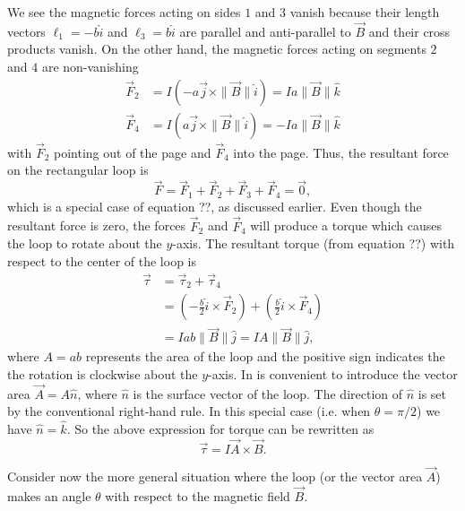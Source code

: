 We see the magnetic forces acting on sides $1$ and $3$ vanish because their length vectors $\ell_1 = -b \hat{i}$ and $\ell_3 = b \hat{i}$ are parallel and anti-parallel to $\vec{B}$ and their cross products vanish. On the other hand, the magnetic forces acting on segments $2$ and $4$ are non-vanishing
\begin{align}
    \vec{F}_2 &= I(-a\vec{j} \times \| \vec{B} \|\hat{i}) = Ia\|\vec{B}\| \hat{k} \\
    \vec{F}_4 &= I(a\vec{j} \times \| \vec{B} \|\hat{i}) = - Ia\|\vec{B}\| \hat{k} 
\end{align}
with $\vec{F}_2$ pointing out of the page and $\vec{F}_4$ into the page. Thus, the resultant force on the rectangular loop is
\begin{equation}
    \vec{F} = \vec{F}_1 + \vec{F}_2 + \vec{F}_3 + \vec{F}_4 = \vec{0},
\end{equation}
which is a special case of equation ??, as discussed earlier. Even though the resultant force is zero, the forces $\vec{F}_2$ and $\vec{F}_4$ will produce a torque which causes the loop to rotate about the $y$-axis. 
The resultant torque (from equation ??) with respect to the center of the loop is
\begin{align}
    \vec{\tau} &= \vec{\tau}_2 + \vec{\tau}_4 \\
    &= \left(-\frac{b}{2}\hat{i} \times \vec{F}_2\right) + \left(\frac{b}{2}\hat{i} \times \vec{F}_4\right) \\
    &= Iab\|\vec{B}\|\hat{j} = IA\|\vec{B}\|\hat{j},
\end{align}
where $A=ab$ represents the area of the loop and the positive sign indicates the the rotation is clockwise about the $y$-axis. In is convenient to introduce the vector area $\vec{A} = A\hat{n}$, where $\hat{n}$ is the surface vector of the loop. The direction of $\hat{n}$ is set by the conventional right-hand rule. In this special case (i.e. when $\theta = \pi/2$) we have $\hat{n} = \hat{k}$. So the above expression for torque can be rewritten as
\begin{equation}
    \vec{\tau} = I \vec{A} \times \vec{B}. 
\end{equation}

Consider now the more general situation where the loop (or the vector area $\vec{A}$) makes an angle $\theta$ with respect to the magnetic field $\vec{B}$. 

